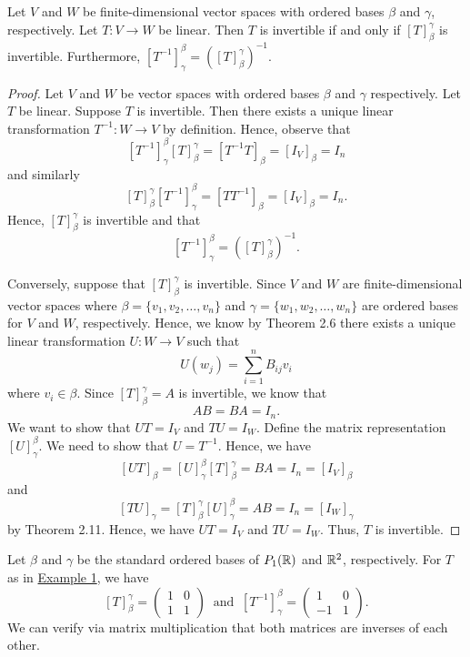 \begin{theorem}\label{Theorem 2.18}
   Let \( V  \) and \( W  \) be finite-dimensional vector spaces with ordered bases \( \beta \) and \( \gamma  \), respectively. Let \( T: V \to W  \) be linear. Then \( T  \) is invertible if and only if \( [T]_{\beta}^{\gamma}   \) is invertible. Furthermore, \( [T^{-1}]_{\gamma}^{\beta}  = ([T]_{\beta}^{\gamma} )^{-1} \).
\end{theorem}
\begin{proof}
Let \( V  \) and \( W  \) be vector spaces with ordered bases \( \beta  \) and \( \gamma \) respectively. Let \( T  \) be linear. Suppose \( T  \) is invertible. Then there exists a unique linear transformation \( T^{-1}: W \to V  \) by definition. Hence, observe that 
\[  [T^{-1}]_{\gamma}^{\beta}  [T]_{\beta}^{\gamma}  = [T^{-1}T ]_{\beta} = [{I}_{V}]_{\beta} = {I}_{n}  \]
and similarly
\[ [T]_{\beta}^{\gamma}  [T^{-1}]_{\gamma}^{\beta}  = [T T^{-1}]_{\beta} = [{I}_{V}]_{\beta} = {I}_{n}.        \]
Hence, \( [T]_{\beta}^{\gamma}  \) is invertible and that 
\[ [T^{-1}]_{\gamma}^{\beta}  = ([T]_{\beta}^{\gamma} )^{-1}.  \]

Conversely, suppose that \( [T]_{\beta}^{\gamma}  \) is invertible. Since \( V \) and \( W  \) are finite-dimensional vector spaces where  \( \beta = \{ {v}_{1}, {v}_{2}, \dots, {v}_{n} \}  \) and \( \gamma = \{ {w}_{1}, {w}_{2}, \dots, {w}_{n} \}  \) are ordered bases for \( V  \) and \( W  \), respectively. Hence, we know by Theorem 2.6 there exists a unique linear transformation \( U: W \to V  \) such that 
\[  U({w}_{j}) = \sum_{ i = 1   }^{ n } {B}_{ij} {v}_{i}    \]
where \( {v}_{i} \in \beta \). Since \( [T]_{\beta}^{\gamma} = A   \) is invertible, we know that 
\[  AB = BA = I_n.  \] We want to show that \( UT = {I}_{V}  \) and \( TU = {I}_{W} \). Define the matrix representation \( [U]_{\gamma}^{\beta}  \). We need to show that \(  U = T^{-1} \). Hence, we have
\[  [UT]_{\beta} = [U]_{\gamma}^{\beta} [T]_{\beta}^{\gamma} = BA = {I}_{n} = [{I}_{V}]_{\beta}      \]
and 
\[ [TU]_{\gamma} = [T]_{\beta}^{\gamma} [U]_{\gamma}^{\beta} = AB = {I}_{n} = [{I}_{W}]_{\gamma}      \]
by Theorem 2.11. Hence, we have \( UT = {I}_{V}  \) and \( TU = {I}_{W} \). Thus, \( T  \) is invertible.
\end{proof}

\begin{eg}
    Let \( \beta  \) and \( \gamma  \) be the standard ordered bases of \( {P}_{1}(\mathbb{R})  \) and \( \mathbb{R}^{2} \), respectively. For \( T  \) as in {\hyperref[Eg 2.4.1]{Example 1}}, we have  
    \[  [T]_{\beta}^{\gamma} = \begin{pmatrix}
        1 & 0 \\
        1 & 1 
    \end{pmatrix}  \ \text{ and } \ [T^{-1}]_{\gamma}^{\beta} = \begin{pmatrix}
        1 & 0 \\
        -1 & 1 
    \end{pmatrix}.\]
    We can verify via matrix multiplication that both matrices are inverses of each other.
\end{eg}

